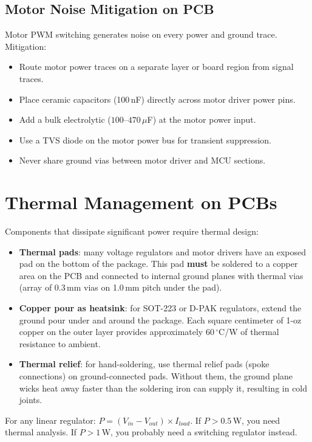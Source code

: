 \subsection{Motor Noise Mitigation on PCB}
Motor PWM switching generates noise on every power and ground trace. Mitigation:
\begin{itemize}[nosep,leftmargin=1.5em]
\item Route motor power traces on a separate layer or board region from signal traces.
\item Place ceramic capacitors (100\,nF) directly across motor driver power pins.
\item Add a bulk electrolytic ($100$--$470\,\mu$F) at the motor power input.
\item Use a TVS diode on the motor power bus for transient suppression.
\item Never share ground vias between motor driver and MCU sections.
\end{itemize}

\section{Thermal Management on PCBs}
Components that dissipate significant power require thermal design:
\begin{itemize}[leftmargin=1.5em]
\item \textbf{Thermal pads}: many voltage regulators and motor drivers have an exposed pad on the bottom of the package. This pad \textbf{must} be soldered to a copper area on the PCB and connected to internal ground planes with thermal vias (array of 0.3\,mm vias on 1.0\,mm pitch under the pad).
\item \textbf{Copper pour as heatsink}: for SOT-223 or D-PAK regulators, extend the ground pour under and around the package. Each square centimeter of 1-oz copper on the outer layer provides approximately $60\,^{\circ}$C/W of thermal resistance to ambient.
\item \textbf{Thermal relief}: for hand-soldering, use thermal relief pads (spoke connections) on ground-connected pads. Without them, the ground plane wicks heat away faster than the soldering iron can supply it, resulting in cold joints.
\end{itemize}

\begin{tipbox}
For any linear regulator: $P = (V_{in} - V_{out}) \times I_{load}$. If $P > 0.5$\,W, you need thermal analysis. If $P > 1$\,W, you probably need a switching regulator instead.
\end{tipbox}

